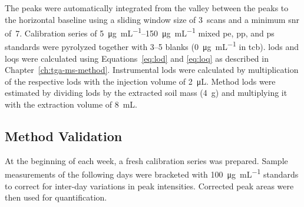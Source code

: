The peaks were automatically integrated from the valley between the peaks to the horizontal baseline using a sliding window size of 3~scans and a minimum \ac{snr} of~7.
Calibration series of \SIrange{5}{150}{\micro\gram\per\milli\liter} mixed \ac{pe}, \ac{pp}, and \ac{ps} standards were pyrolyzed together with \numrange{3}{5} blanks (\SI{0}{\micro\gram\per\milli\liter} in \ac{tcb}).
\Acp{lod} and \acp{loq} were calculated using Equations~\ref{eq:lod} and \ref{eq:loq} as described in Chapter~\ref{ch:tga-ms-method}.
%
%
%
Instrumental \acp{lod} were calculated by multiplication of the respective \acp{lod} with the injection volume of \SI{2}{\micro\liter}. Method \acp{lod} were estimated by dividing \acp{lod} by the extracted soil mass (\SI{4}{\gram}) and multiplying it with the extraction volume of \SI{8}{\milli\liter}.

\subsection{Method Validation}

At the beginning of each week, a fresh calibration series was prepared. Sample measurements of the following days were bracketed with \SI{100}{\micro\gram\per\milli\liter} standards to correct for inter-day variations in peak intensities. Corrected peak areas were then used for quantification.

